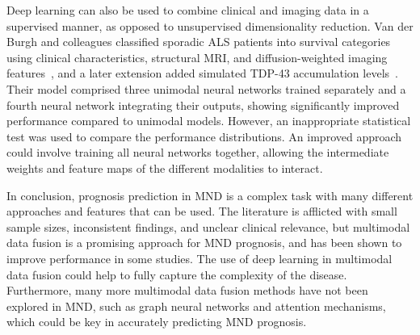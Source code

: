Deep learning can also be used to combine clinical and imaging data in a supervised manner, as opposed to unsupervised dimensionality reduction.
Van der Burgh and colleagues classified sporadic ALS patients into survival categories using clinical characteristics, structural MRI, and diffusion-weighted imaging features~\cite{vanderburghDeepLearningPredictions2017}, and a later extension added simulated TDP-43 accumulation levels~\cite{meierConnectomeBasedPropagation2020}.
Their model comprised three unimodal neural networks trained separately and a fourth neural network integrating their outputs, showing significantly improved performance compared to unimodal models.
However, an inappropriate statistical test was used to compare the performance distributions.
An improved approach could involve training all neural networks together, allowing the intermediate weights and feature maps of the different modalities to interact.

In conclusion, prognosis prediction in MND is a complex task with many different approaches and features that can be used.
The literature is afflicted with small sample sizes, inconsistent findings, and unclear clinical relevance, but multimodal data fusion is a promising approach for MND prognosis, and has been shown to improve performance in some studies.
The use of deep learning in multimodal data fusion could help to fully capture the complexity of the disease.
Furthermore, many more multimodal data fusion methods have not been explored in MND, such as graph neural networks and attention mechanisms, which could be key in accurately predicting MND prognosis.
